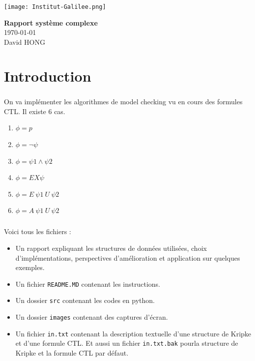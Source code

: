 \documentclass[12pt,a4paper]{report}
\begin{document}
\begin{titlepage}
    \begin{sffamily}
    \begin{center}
        \begin{flushright}
            \texttt{[image: Institut-Galilee.png]}~\\[7.5cm]
        \end{flushright}
        { \huge \bfseries Rapport système complexe\\[1.0cm] }
        {\large \today \\[1.0cm]}
        \LARGE David HONG
    \end{center}
    \end{sffamily}
\end{titlepage}

\setcounter{tocdepth}{2}
\tableofcontents
\newpage

\chapter*{Introduction}

\paragraph{}On va implémenter les algorithmes de model checking vu en cours des formules CTL. Il existe 6 cas.

\begin{enumerate}
    \item $\phi = p$
    \item $\phi = \neg\psi$
    \item $\phi = \psi1 \land \psi2$
    \item $\phi = EX\psi$
    \item $\phi = E\ \psi1\ U\ \psi2$
    \item $\phi = A\ \psi1\ U\ \psi2$
\end{enumerate}

\paragraph{}Voici tous les fichiers :
\begin{itemize}
    \item Un rapport expliquant les structures de données utilisées, choix d'implémentations, perspectives d'amélioration et application sur quelques exemples.
    \item Un fichier \verb+README.MD+ contenant les instructions.
    \item Un dossier \verb+src+ contenant les codes en python.
    \item Un dossier \verb+images+ contenant des captures d'écran.
    \item Un fichier \verb+in.txt+ contenant la description textuelle d'une structure de Kripke et d'une formule CTL. Et aussi un fichier \verb+in.txt.bak+ pourla structure de Kripke et la formule CTL par défaut.
\end{itemize}
\end{document}
